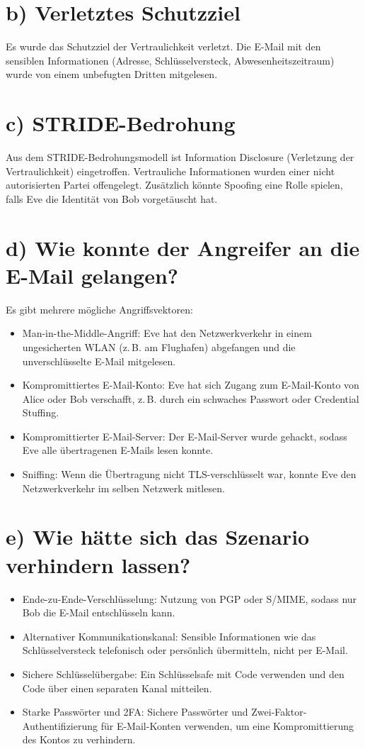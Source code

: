 \documentclass[
	fontsize=12pt,          %
	paper=a4,               %
	numbers=noenddot,       %
	listof=totoc,           %
	listof=entryprefix,     %
	listof=nochaptergap,    %
	bibliography=totoc,     %
	parskip=half,           %
	openany                 %
]{scrbook}
\begin{document}
\section*{b) Verletztes Schutzziel}
Es wurde das Schutzziel der Vertraulichkeit verletzt.
Die E-Mail mit den sensiblen Informationen (Adresse, Schlüsselversteck, Abwesenheitszeitraum) wurde von einem unbefugten Dritten mitgelesen.

\section*{c) STRIDE-Bedrohung}
Aus dem STRIDE-Bedrohungsmodell ist Information Disclosure (Verletzung der Vertraulichkeit) eingetroffen.
Vertrauliche Informationen wurden einer nicht autorisierten Partei offengelegt.
Zusätzlich könnte Spoofing eine Rolle spielen, falls Eve die Identität von Bob vorgetäuscht hat.

\newpage
\section*{d) Wie konnte der Angreifer an die E-Mail gelangen?}
Es gibt mehrere mögliche Angriffsvektoren:
\begin{itemize}
	\item Man-in-the-Middle-Angriff: Eve hat den Netzwerkverkehr in einem ungesicherten WLAN (z.\,B. am Flughafen) abgefangen und die unverschlüsselte E-Mail mitgelesen.
	\item Kompromittiertes E-Mail-Konto: Eve hat sich Zugang zum E-Mail-Konto von Alice oder Bob verschafft, z.\,B. durch ein schwaches Passwort oder Credential Stuffing.
	\item Kompromittierter E-Mail-Server: Der E-Mail-Server wurde gehackt, sodass Eve alle übertragenen E-Mails lesen konnte.
	\item Sniffing: Wenn die Übertragung nicht TLS-verschlüsselt war, konnte Eve den Netzwerkverkehr im selben Netzwerk mitlesen.
\end{itemize}

\section*{e) Wie hätte sich das Szenario verhindern lassen?}
\begin{itemize}
	\item Ende-zu-Ende-Verschlüsselung: Nutzung von PGP oder S/MIME, sodass nur Bob die E-Mail entschlüsseln kann.
	\item Alternativer Kommunikationskanal: Sensible Informationen wie das Schlüsselversteck telefonisch oder persönlich übermitteln, nicht per E-Mail.
	\item Sichere Schlüsselübergabe: Ein Schlüsselsafe mit Code verwenden und den Code über einen separaten Kanal mitteilen.
	\item Starke Passwörter und 2FA: Sichere Passwörter und Zwei-Faktor-Authentifizierung für E-Mail-Konten verwenden, um eine Kompromittierung des Kontos zu verhindern.
\end{itemize}
\end{document}
